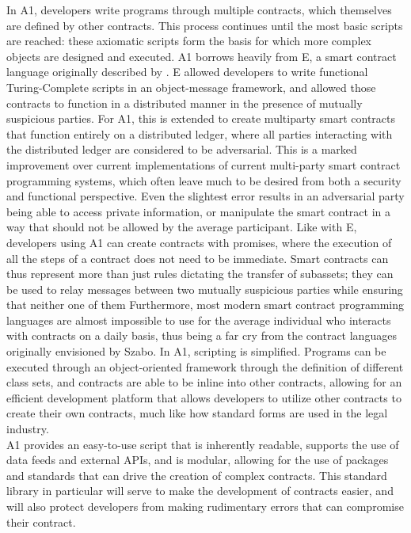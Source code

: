 \documentclass[conference]{IEEEtran}
\begin{document}
 In A1, developers write programs through multiple contracts, which themselves are defined by other contracts. This process continues until the most basic scripts are reached: these axiomatic scripts form the basis for which more complex objects are designed and executed. A1 borrows heavily from E, a smart contract language originally described by \cite{miller1997E}. E allowed developers to write functional Turing-Complete scripts in an object-message framework, and allowed those contracts to function in a distributed manner in the presence of mutually suspicious parties. For A1, this is extended to create multiparty smart contracts that function entirely on a distributed ledger, where all parties interacting with the distributed ledger are considered to be adversarial. This is a marked improvement over current implementations of current multi-party smart contract programming systems,  which often leave much to be desired from both a security and functional perspective. Even the slightest error results in an adversarial party being able to access  private information, or manipulate the smart contract in a way that should not be allowed by the average participant. Like with E, developers using A1 can create contracts with promises, where the execution of all the steps of a contract does not need to be immediate. Smart contracts can thus represent more than just rules dictating the transfer of subassets; they can be used to relay messages between two mutually suspicious parties while ensuring that neither one of them  Furthermore, most modern smart contract programming languages are almost impossible to use for the average individual who interacts with contracts on a daily basis, thus being a far cry from the contract languages originally envisioned by Szabo. In A1, scripting is simplified. Programs can be executed through an object-oriented framework through the definition of different class sets, and contracts are able to be inline into other contracts, allowing for an efficient development platform that allows developers to utilize other contracts to create their own contracts, much like how standard forms are used in the legal industry.\\

A1 provides an easy-to-use script that is inherently readable, supports the use of data feeds and external APIs, and is modular, allowing for the use of packages and standards that can drive the creation of complex contracts. This standard library in particular will serve to make the development of contracts easier, and will also protect developers from making rudimentary errors that can compromise their contract. 
\end{document}
